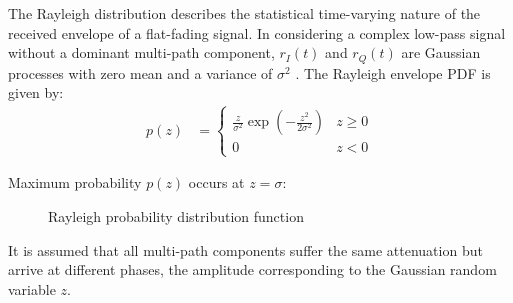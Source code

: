 The Rayleigh distribution describes the statistical time-varying nature of the received envelope of a flat-fading signal\cite{4vn}. In considering a complex low-pass signal without a dominant multi-path component, \(r_I(t)\) and \(r_Q(t)\) are Gaussian processes with zero mean and a variance of \(\sigma^2\) \cite{fuqin}. The Rayleigh envelope \gls{PDF} is given by:
\begin{align}
	p(z) &=
	\begin{cases}
		\frac{z}{\sigma^2} \exp \left( -\frac{z^2}{2\sigma^2} \right) & z \geq 0 \\
		0 & z < 0
	\end{cases}
\end{align}
\begin{mathDef}
\end{mathDef}
Maximum probability \(p(z)\) occurs at \(z=\sigma\):
\begin{figure}[!ht]
	\centering
	\resizebox{0.8\textwidth}{!}{}
	\caption{Rayleigh probability distribution function}
\end{figure}
It is assumed that all multi-path components suffer the same attenuation but arrive at different phases, the amplitude corresponding to the Gaussian random variable \(z\)\cite{Hindu}.
